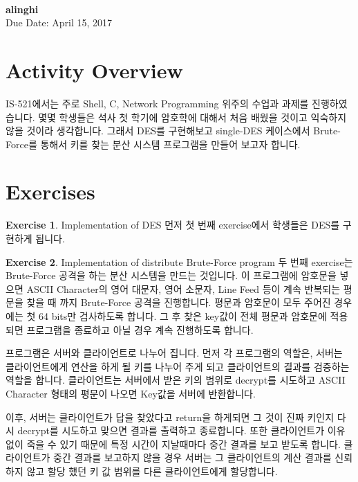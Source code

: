 \documentclass[a4paper, 11pt]{article}
\theoremstyle{definition}
\newtheorem{exercise}{Exercise}
\begin{document}
 \\
         {\phantom{} \hfill \textbf{alinghi}} \\
         {\phantom{} \hfill Due Date: April 15, 2017} \\

\section{Activity Overview}
IS-521에서는 주로 Shell, C, Network Programming 위주의 수업과 과제를 진행하였습니다.
몇몇 학생들은 석사 첫 학기에 암호학에 대해서 처음 배웠을 것이고 익숙하지 않을 것이라 생각합니다.
그래서 DES를 구현해보고 single-DES 케이스에서 Brute-Force를 통해서 키를 찾는 분산 시스템 프로그램을 만들어 보고자 합니다.

\section{Exercises}
\begin{exercise} Implementation of DES
\newline
먼저 첫 번째 exercise에서 학생들은 DES를 구현하게 됩니다.
\end{exercise}

\begin{exercise} Implementation of distribute Brute-Force program
\newline
두 번째 exercise는 Brute-Force 공격을 하는 분산 시스템을 만드는 것입니다.
이 프로그램에 암호문을 넣으면 ASCII Character의 영어 대문자, 영어 소문자, Line Feed 등이 계속 반복되는 평문을 찾을 때 까지 Brute-Force 공격을 진행합니다. 평문과 암호문이 모두 주어진 경우에는 첫 64 bits만 검사하도록 합니다. 그 후 찾은 key값이 전체 평문과 암호문에 적용 되면 프로그램을 종료하고 아닐 경우 계속 진행하도록 합니다.

프로그램은 서버와 클라이언트로 나누어 집니다. 먼저 각 프로그램의 역할은, 서버는 클라이언트에게 연산을 하게 될 키를 나누어 주게 되고 클라이언트의 결과를 검증하는 역할을 합니다. 클라이언트는 서버에서 받은 키의 범위로 decrypt를 시도하고 ASCII Character 형태의 평문이 나오면 Key값을 서버에 반환합니다.

이후, 서버는 클라이언트가 답을 찾았다고 return을 하게되면 그 것이 진짜 키인지 다시 decrypt를 시도하고 맞으면 결과를 출력하고 종료합니다. 또한 클라이언트가 이유 없이 죽을 수 있기 때문에 특정 시간이 지날때마다 중간 결과를 보고 받도록 합니다. 클라이언트가 중간 결과를 보고하지 않을 경우 서버는 그 클라이언트의 계산 결과를 신뢰하지 않고 할당 했던 키 값 범위를 다른 클라이언트에게 할당합니다.


\end{exercise}
\end{document}
